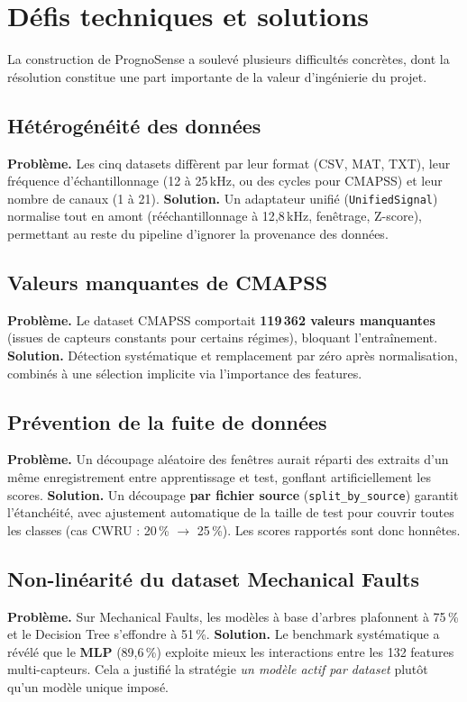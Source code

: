 \chapter{Défis techniques et solutions}
\label{chap:defis}

La construction de PrognoSense a soulevé plusieurs difficultés concrètes, dont la résolution
constitue une part importante de la valeur d'ingénierie du projet.

\section{Hétérogénéité des données}
\textbf{Problème.} Les cinq datasets diffèrent par leur format (CSV, MAT, TXT), leur
fréquence d'échantillonnage (12 à 25\,kHz, ou des cycles pour CMAPSS) et leur nombre de
canaux (1 à 21). \textbf{Solution.} Un adaptateur unifié (\texttt{UnifiedSignal}) normalise
tout en amont (rééchantillonnage à 12{,}8\,kHz, fenêtrage, Z-score), permettant au reste du
pipeline d'ignorer la provenance des données.

\section{Valeurs manquantes de CMAPSS}
\textbf{Problème.} Le dataset CMAPSS comportait \textbf{119\,362 valeurs manquantes} (issues
de capteurs constants pour certains régimes), bloquant l'entraînement.
\textbf{Solution.} Détection systématique et remplacement par zéro après normalisation,
combinés à une sélection implicite via l'importance des features.

\section{Prévention de la fuite de données}
\textbf{Problème.} Un découpage aléatoire des fenêtres aurait réparti des extraits d'un même
enregistrement entre apprentissage et test, gonflant artificiellement les scores.
\textbf{Solution.} Un découpage \textbf{par fichier source} (\texttt{split\_by\_source})
garantit l'étanchéité, avec ajustement automatique de la taille de test pour couvrir toutes
les classes (cas CWRU : 20\,\% $\rightarrow$ 25\,\%). Les scores rapportés sont donc
honnêtes.

\section{Non-linéarité du dataset Mechanical Faults}
\textbf{Problème.} Sur Mechanical Faults, les modèles à base d'arbres plafonnent à 75\,\% et
le Decision Tree s'effondre à 51\,\%. \textbf{Solution.} Le benchmark systématique a révélé
que le \textbf{MLP} (89{,}6\,\%) exploite mieux les interactions entre les 132 features
multi-capteurs. Cela a justifié la stratégie \emph{un modèle actif par dataset} plutôt qu'un
modèle unique imposé.

